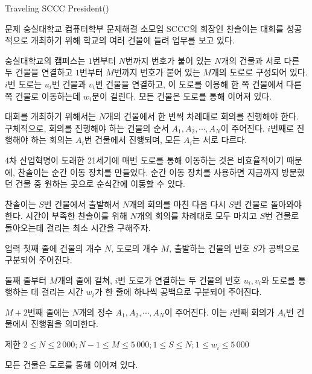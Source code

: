 
\begin{frame}[label=p1]{Traveling SCCC President(\prob)}

\tiny

\begin{block}{문제}
숭실대학교 컴퓨터학부 문제해결 소모임 SCCC의 회장인 찬솔이는 대회를 성공적으로 개최하기 위해 학교의 여러 건물에 들려 업무를 보고 있다.

숭실대학교의 캠퍼스는 
$1$번부터 
$N$번까지 번호가 붙어 있는 
$N$개의 건물과 서로 다른 두 건물을 연결하고 
$1$번부터 
$M$번까지 번호가 붙어 있는 
$M$개의 도로로 구성되어 있다. 
$i$번 도로는 
$u_i$번 건물과 
$v_i$번 건물을 연결하고, 이 도로를 이용해 한 쪽 건물에서 다른 쪽 건물로 이동하는데 
$w_i$분이 걸린다. 모든 건물은 도로를 통해 이어져 있다.

대회를 개최하기 위해서는 
$N$개의 건물에서 한 번씩 차례대로 회의를 진행해야 한다. 구체적으로, 회의를 진행해야 하는 건물의 순서 
$A_1,A_2,\cdots ,A_N$이 주어진다. 
$i$번째로 진행해야 하는 회의는 
$A_i$번 건물에서 진행되며, 모든 
$A_i$는 서로 다르다.

4차 산업혁명이 도래한 21세기에 매번 도로를 통해 이동하는 것은 비효율적이기 때문에, 찬솔이는 순간 이동 장치를 만들었다. 순간 이동 장치를 사용하면 지금까지 방문했던 건물 중 원하는 곳으로 순식간에 이동할 수 있다.

찬솔이는 
$S$번 건물에서 출발해서 
$N$개의 회의를 마친 다음 다시 
$S$번 건물로 돌아와야 한다. 시간이 부족한 찬솔이를 위해 
$N$개의 회의를 차례대로 모두 마치고 
$S$번 건물로 돌아오는데 걸리는 최소 시간을 구해주자.

\end{block}

\begin{block}{입력}
첫째 줄에 건물의 개수 
$N$, 도로의 개수 
$M$, 출발하는 건물의 번호 
$S$가 공백으로 구분되어 주어진다.

둘째 줄부터 
$M$개의 줄에 걸쳐, 
$i$번 도로가 연결하는 두 건물의 번호 
$u_i,v_i$와 도로를 통행하는 데 걸리는 시간 
$w_i$가 한 줄에 하나씩 공백으로 구분되어 주어진다.

$M+2$번째 줄에는 
$N$개의 정수 
$A_1,A_2,\cdots ,A_N$이 주어진다. 이는 
$i$번째 회의가 
$A_i$번 건물에서 진행됨을 의미한다.
\end{block}

\begin{block}{제한}
$2\leq N\leq 2\, 000; N-1\leq M\leq 5\, 000; 1\leq S\leq N; 1\leq w_i\leq 5\, 000$ 

모든 건물은 도로를 통해 이어져 있다.
\end{block}
\end{frame}


